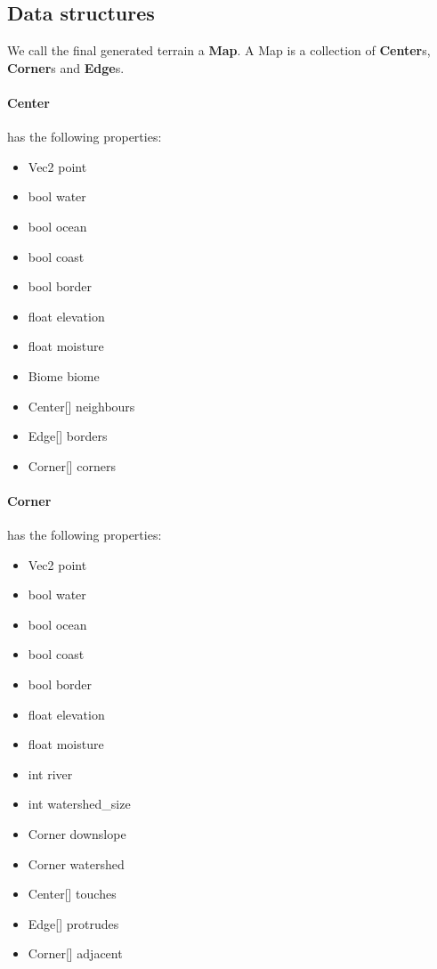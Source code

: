 
\subsection{Data structures}

We call the final generated terrain a \textbf{Map}.
A Map is a collection of \textbf{Center}s, \textbf{Corner}s and \textbf{Edge}s.

\paragraph{Center} has the following properties:

\begin{itemize}
	\item Vec2 point
	\item bool water
	\item bool ocean
	\item bool coast
	\item bool border
	\item float elevation
	\item float moisture
	\item Biome biome
	\item Center[] neighbours
	\item Edge[] borders
	\item Corner[] corners
\end{itemize}

\paragraph{Corner} has the following properties:

\begin{itemize}
	\item Vec2 point
	\item bool water
	\item bool ocean
	\item bool coast
	\item bool border
	\item float elevation
	\item float moisture
	\item int river
	\item int watershed\_size
	\item Corner downslope
	\item Corner watershed
	\item Center[] touches
	\item Edge[] protrudes
	\item Corner[] adjacent
\end{itemize}

